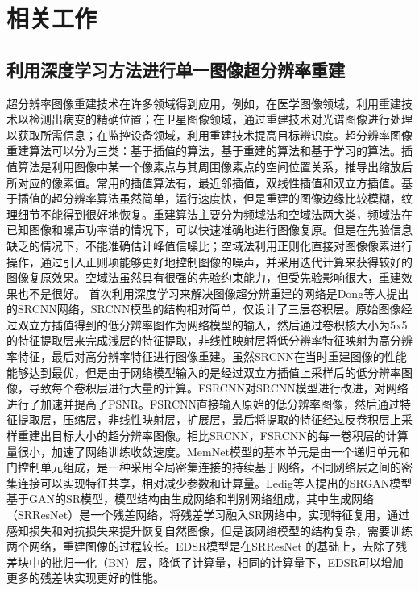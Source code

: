 \documentclass{cjc}
\begin{document}
\section{相关工作}

\subsection{利用深度学习方法进行单一图像超分辨率重建}
超分辨率图像重建技术在许多领域得到应用，例如，在医学图像领域，利用重建技术以检测出病变的精确位置；在卫星图像领域，通过重建技术对光谱图像进行处理以获取所需信息；在监控设备领域，利用重建技术提高目标辨识度。超分辨率图像重建算法可以分为三类：基于插值的算法，基于重建的算法和基于学习的算法。插值算法是利用图像中某一个像素点与其周围像素点的空间位置关系，推导出缩放后所对应的像素值。常用的插值算法有，最近邻插值，双线性插值和双立方插值。基于插值的超分辨率算法虽然简单，运行速度快，但是重建的图像边缘比较模糊，纹理细节不能得到很好地恢复。重建算法主要分为频域法和空域法两大类，频域法在已知图像和噪声功率谱的情况下，可以快速准确地进行图像复原。但是在先验信息缺乏的情况下，不能准确估计峰值信噪比；空域法利用正则化直接对图像像素进行操作，通过引入正则项能够更好地控制图像的噪声，并采用迭代计算来获得较好的图像复原效果。空域法虽然具有很强的先验约束能力，但受先验影响很大，重建效果也不是很好。
首次利用深度学习来解决图像超分辨重建的网络是Dong等人\cite{srcnn}提出的SRCNN网络，SRCNN模型的结构相对简单，仅设计了三层卷积层。原始图像经过双立方插值得到的低分辨率图作为网络模型的输入，然后通过卷积核大小为5x5的特征提取层来完成浅层的特征提取，非线性映射层将低分辨率特征映射为高分辨率特征，最后对高分辨率特征进行图像重建。虽然SRCNN在当时重建图像的性能能够达到最优，但是由于网络模型输入的是经过双立方插值上采样后的低分辨率图像，导致每个卷积层进行大量的计算。FSRCNN\cite{fsrcnn}对SRCNN模型进行改进，对网络进行了加速并提高了PSNR。FSRCNN直接输入原始的低分辨率图像，然后通过特征提取层，压缩层，非线性映射层，扩展层，最后将提取的特征经过反卷积层上采样重建出目标大小的超分辨率图像。相比SRCNN，FSRCNN的每一卷积层的计算量很小，加速了网络训练收敛速度。MemNet\cite{memnet}模型的基本单元是由一个递归单元和门控制单元组成，是一种采用全局密集连接的持续基于网络，不同网络层之间的密集连接可以实现特征共享，相对减少参数和计算量。Ledig等人\cite{srgan}提出的SRGAN模型基于GAN的SR模型，模型结构由生成网络和判别网络组成，其中生成网络（SRResNet）是一个残差网络，将残差学习融入SR网络中，实现特征复用，通过感知损失和对抗损失来提升恢复自然图像，但是该网络模型的结构复杂，需要训练两个网络，重建图像的过程较长。EDSR\cite{edsr}模型是在SRResNet
的基础上，去除了残差块中的批归一化（BN）层，降低了计算量，相同的计算量下，EDSR可以增加更多的残差块实现更好的性能。
\end{document}
